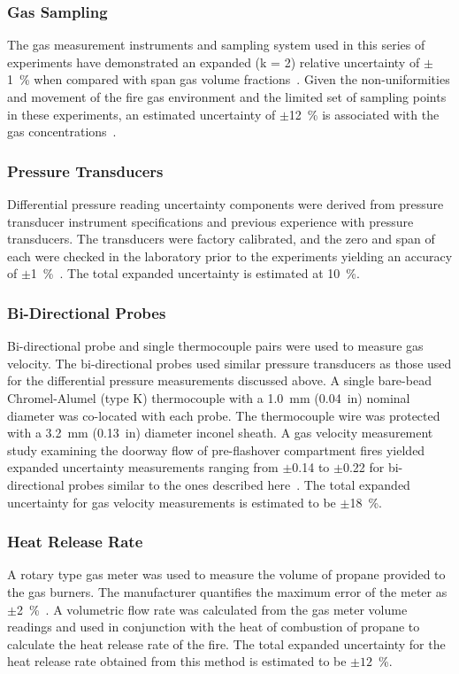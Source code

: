 \documentclass[12pt,oneside]{book}
\begin{document}
\subsubsection{Gas Sampling}
The gas measurement instruments and sampling system used in this series of experiments have demonstrated an expanded (k = 2) relative uncertainty of $\pm$1~\% when compared with span gas volume fractions~\cite{Bundy:2007}. Given the non-uniformities and movement of the fire gas environment and the limited set of sampling points in these experiments, an estimated uncertainty of $\pm$12~\% is associated with the gas concentrations~\cite{Lock:1}.

\subsubsection{Pressure Transducers}
Differential pressure reading uncertainty components were derived from pressure transducer instrument specifications and previous experience with pressure transducers. The transducers were factory calibrated, and the zero and span of each were checked in the laboratory prior to the experiments yielding an accuracy of $\pm$1~\%~\cite{Setra:2002}. The total expanded uncertainty is estimated at 10~\%.

\subsubsection{Bi-Directional Probes}
Bi-directional probe and single thermocouple pairs were used to measure gas velocity. The bi-directional probes used similar pressure transducers as those used for the differential pressure measurements discussed above. A single bare-bead Chromel-Alumel (type K) thermocouple with a 1.0~mm (0.04~in) nominal diameter was co-located with each probe. The thermocouple wire was protected with a 3.2~mm (0.13~in) diameter inconel sheath. A gas velocity measurement study examining the doorway flow of pre-flashover compartment fires yielded expanded uncertainty measurements ranging from $\pm$0.14 to $\pm$0.22 for bi-directional probes similar to the ones described here~\cite{Bryant:FSJ2009}. The total expanded uncertainty for gas velocity measurements is estimated to be $\pm$18~\%.

\subsubsection{Heat Release Rate}
A rotary type gas meter was used to measure the volume of propane provided to the gas burners. The manufacturer quantifies the maximum error of the meter as $\pm$2~\%~\cite{Romet:2014}. A volumetric flow rate was calculated from the gas meter volume readings and used in conjunction with the heat of combustion of propane to calculate the heat release rate of the fire. The total expanded uncertainty for the heat release rate obtained from this method is estimated to be $\pm12$~\%.
\end{document}
